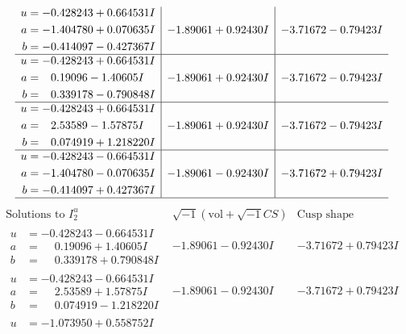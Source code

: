 \documentclass[1p]{elsarticle_modified}
\theoremstyle{definition}
\newcommand{\I}{\sqrt{-1}}
\begin{document}
$$\begin{array}{c|c|c}
\begin{aligned}
u &= -0.428243 + 0.664531 I \\
a &= -1.404780 + 0.070635 I \\
b &= -0.414097 - 0.427367 I\end{aligned}
 & -1.89061 + 0.92430 I & -3.71672 - 0.79423 I \\ \hline\begin{aligned}
u &= -0.428243 + 0.664531 I \\
a &= \phantom{-}0.19096 - 1.40605 I \\
b &= \phantom{-}0.339178 - 0.790848 I\end{aligned}
 & -1.89061 + 0.92430 I & -3.71672 - 0.79423 I \\ \hline\begin{aligned}
u &= -0.428243 + 0.664531 I \\
a &= \phantom{-}2.53589 - 1.57875 I \\
b &= \phantom{-}0.074919 + 1.218220 I\end{aligned}
 & -1.89061 + 0.92430 I & -3.71672 - 0.79423 I \\ \hline\begin{aligned}
u &= -0.428243 - 0.664531 I \\
a &= -1.404780 - 0.070635 I \\
b &= -0.414097 + 0.427367 I\end{aligned}
 & -1.89061 - 0.92430 I & -3.71672 + 0.79423 I\\
 \hline 
 \end{array}$$\newpage$$\begin{array}{c|c|c}  
\text{Solutions to }I^u_{2}& \I (\text{vol} + \sqrt{-1}CS) & \text{Cusp shape}\\
 \hline 
\begin{aligned}
u &= -0.428243 - 0.664531 I \\
a &= \phantom{-}0.19096 + 1.40605 I \\
b &= \phantom{-}0.339178 + 0.790848 I\end{aligned}
 & -1.89061 - 0.92430 I & -3.71672 + 0.79423 I \\ \hline\begin{aligned}
u &= -0.428243 - 0.664531 I \\
a &= \phantom{-}2.53589 + 1.57875 I \\
b &= \phantom{-}0.074919 - 1.218220 I\end{aligned}
 & -1.89061 - 0.92430 I & -3.71672 + 0.79423 I \\ \hline\begin{aligned}
u &= -1.073950 + 0.558752 I \\

\end{aligned}
\end{array}$$
\end{document}
